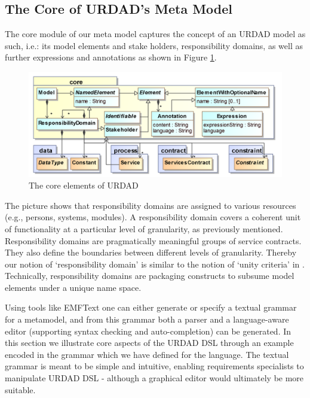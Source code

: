 \subsection{The Core of URDAD's Meta Model}

The core module of our meta model captures the concept of an URDAD model as such, i.e.: its model elements and stake holders, responsibility domains, as well as further expressions and annotations as shown in Figure \ref{fig:coreModule}.
\begin{figure}[Htb]
  \centering
  \includegraphics{core}
  \caption{The core elements of URDAD}
  \label{fig:coreModule}
\end{figure}

The picture shows that responsibility domains are assigned to various resources (e.g., persons, systems, modules). A responsibility domain covers a coherent unit of functionality at a particular level of granularity, as previously mentioned. Responsibility domains are pragmatically meaningful groups of service contracts. They also define the boundaries between different levels of granularity. Thereby our notion of `responsibility domain' is similar to the notion of `unity criteria' in \cite{gonzalez_unity_2009}. Technically, responsibility domains are packaging constructs to subsume model elements under a unique name space.

Using tools like EMFText \cite{heidenreich_derivation_2009} one can either generate or specify a textual grammar for a metamodel, and from this grammar both a parser and a language-aware editor (supporting syntax checking and auto-completion) can be generated. In this section we illustrate core aspects of the URDAD DSL through an example encoded in the grammar which we have defined for the language. The textual grammar is meant to be simple and intuitive, enabling requirements specialists to manipulate URDAD DSL - although a graphical editor would ultimately be more suitable.

